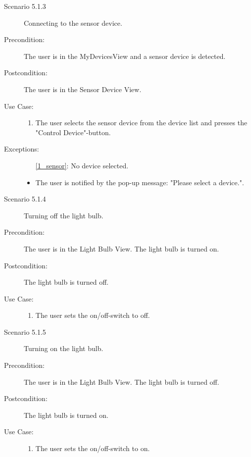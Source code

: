 \documentclass[a4paper]{article}
\begin{document}
\begin{description}
\item[]

\item[Scenario 5.1.3] Connecting to the sensor device.
\item[Precondition:] The user is in the MyDevicesView and a sensor device is detected.
\item[Postcondition:] The user is in the Sensor Device View.
\item[Use Case:]\mbox{}
\begin{enumerate}
\item \label{1_sensor} The user selects the sensor device from the device list and presses the "Control Device"-button.
\end{enumerate}


\item[Exceptions:]
\item[]
\begin{itemize}
\item [\ref{1_sensor}:] No device selected.
\item The user is notified by the pop-up message: "Please select a device.".
\end{itemize}

\item[]

\item[Scenario 5.1.4] Turning off the light bulb.
\item[Precondition:] The user is in the Light Bulb View. The light bulb is turned on.
\item[Postcondition:] The light bulb is turned off.
\item[Use Case:]\mbox{}
\begin{enumerate}
\item  The user sets the on/off-switch to off.
\end{enumerate}

\item[]

\item[Scenario 5.1.5] Turning on the light bulb.
\item[Precondition:] The user is in the Light Bulb View. The light bulb is turned off.
\item[Postcondition:] The light bulb is turned on.
\item[Use Case:]\mbox{}
\begin{enumerate}
\item  The user sets the on/off-switch to on.
\end{enumerate}


\end{description}
\end{document}
